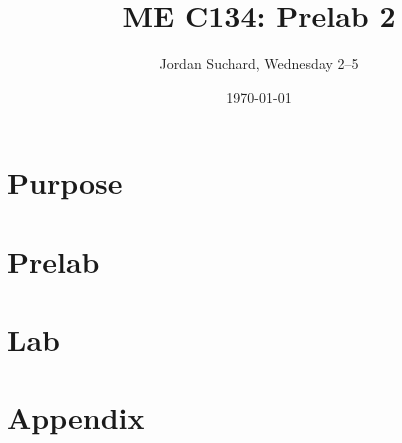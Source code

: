 \documentclass[12pt]{article}
\title{ME C134: Prelab 2}
\author{Jordan Suchard, Wednesday 2--5}
\date{\today}
\begin{document}
\maketitle

\section{Purpose}

\section{Prelab}

\section{Lab}

\appendix

\section{Appendix}
\end{document}
